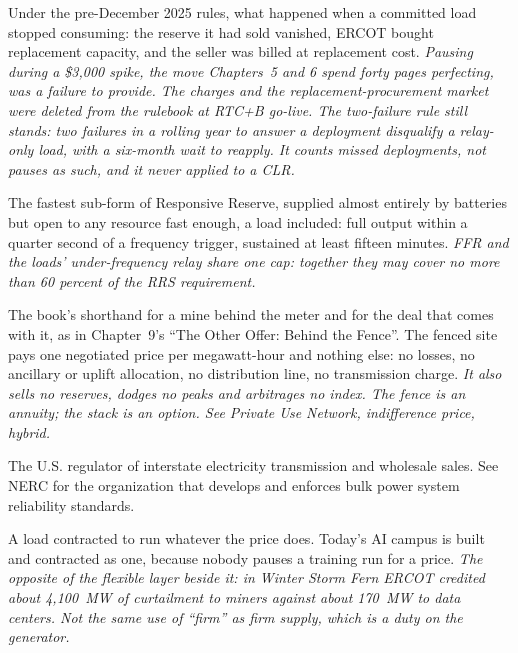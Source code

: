 \begin{description}[leftmargin=0pt,style=unboxed,itemsep=0.35em,parsep=0.15em]
\item[failure to provide] \hypertarget{glossary:failure-to-provide}{}Under the pre-December 2025 rules, what happened when a committed load stopped consuming: the reserve it had sold vanished, ERCOT bought replacement capacity, and the seller was billed at replacement cost. \emph{Pausing during a \$3,000 spike, the move Chapters~5 and 6 spend forty pages perfecting, was a failure to provide. The charges and the replacement-procurement market were deleted from the rulebook at RTC+B go-live. The two-failure rule still stands: two failures in a rolling year to answer a deployment disqualify a relay-only load, with a six-month wait to reapply. It counts missed deployments, not pauses as such, and it never applied to a CLR.}
\item[fast frequency response (FFR)] \hypertarget{glossary:fast-frequency-response}{}The fastest sub-form of Responsive Reserve, supplied almost entirely by batteries but open to any resource fast enough, a load included: full output within a quarter second of a frequency trigger, sustained at least fifteen minutes. \emph{FFR and the loads' under-frequency relay share one cap: together they may cover no more than 60 percent of the RRS requirement.}
\item[fence (the fence)] \hypertarget{glossary:fence}{}The book's shorthand for a mine behind the meter and for the deal that comes with it, as in Chapter~9's ``The Other Offer: Behind the Fence''. The fenced site pays one negotiated price per megawatt-hour and nothing else: no losses, no ancillary or uplift allocation, no distribution line, no transmission charge. \emph{It also sells no reserves, dodges no peaks and arbitrages no index. The fence is an annuity; the stack is an option. See Private Use Network, indifference price, hybrid.}
\item[FERC (Federal Energy Regulatory Commission)] \hypertarget{glossary:ferc}{}The U.S. regulator of interstate electricity transmission and wholesale sales. See NERC for the organization that develops and enforces bulk power system reliability standards.
\item[firm load] \hypertarget{glossary:firm-load}{}A load contracted to run whatever the price does. Today's AI campus is built and contracted as one, because nobody pauses a training run for a price. \emph{The opposite of the flexible layer beside it: in Winter Storm Fern ERCOT credited about 4,100~MW of curtailment to miners against about 170~MW to data centers. Not the same use of ``firm'' as firm supply, which is a duty on the generator.}

\end{description}
